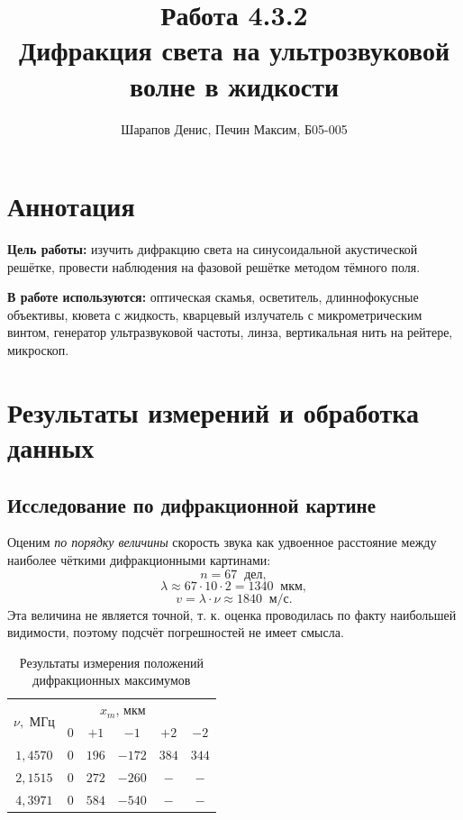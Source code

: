 \documentclass[a4paper]{article}
\title{Работа 4.3.2 \\ Дифракция света на ультрозвуковой волне в жидкости}
\author{Шарапов Денис, Печин Максим, Б05-005}
\date{}
\begin{document}
    \maketitle
    \tableofcontents
    \newpage
    
\section{Аннотация}

\noindent\textbf{Цель работы:} изучить дифракцию света на синусоидальной акустической решётке, провести наблюдения на фазовой решётке методом тёмного поля. \smallskip
 
\noindent \textbf{В работе используются:} оптическая скамья, осветитель, длиннофокусные объективы, кювета с жидкость, кварцевый излучатель с микрометрическим винтом, генератор ультразвуковой частоты, линза, вертикальная нить на рейтере, микроскоп.

\section{Результаты измерений и обработка данных}

\subsection{Исследование по дифракционной картине}

Оценим \emph{по порядку величины} скорость звука как удвоенное расстояние между наиболее чёткими дифракционными картинами:
$$n = 67 \;\;\text{дел},$$
$$\lambda \approx 67\cdot10\cdot2=1340 \;\; \text{мкм},$$
$$v = \lambda \cdot \nu \approx 1840 \;\; \text{м/с}.$$
Эта величина не является точной, т. к. оценка проводилась по факту наибольшей видимости, поэтому подсчёт погрешностей не имеет смысла.


\begin{table}[!ht]
    \centering
    \caption{Результаты измерения положений дифракционных максимумов}
    \begin{tabular}{|c|cccc|c|}
    \hline
    \multirow{2}{*}{$\nu,$ МГц} & \multicolumn{4}{c|}{$x_m$, мкм}                                                               &       \\ \cline{2-6} 
                                & \multicolumn{1}{c|}{$0$} & \multicolumn{1}{c|}{$+1$}  & \multicolumn{1}{c|}{$-1$}   & $+2$  & $-2$  \\ \hline
    $1,4570$                    & \multicolumn{1}{c|}{$0$} & \multicolumn{1}{c|}{$196$} & \multicolumn{1}{c|}{$-172$} & $384$ & $344$ \\ \hline
    $2,1515$                    & \multicolumn{1}{c|}{$0$} & \multicolumn{1}{c|}{$272$} & \multicolumn{1}{c|}{$-260$} & $-$   & $-$   \\ \hline
    $4,3971$                    & \multicolumn{1}{c|}{$0$} & \multicolumn{1}{c|}{$584$} & \multicolumn{1}{c|}{$-540$} & $-$   & $-$   \\ \hline
    \end{tabular}
\end{table}
\end{document}
